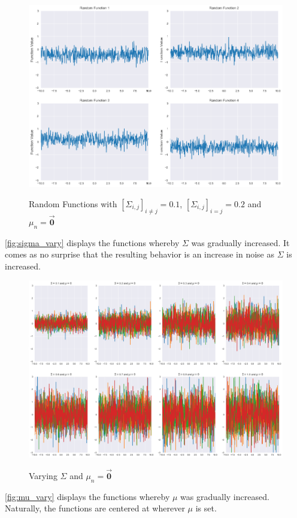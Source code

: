 \documentclass[twoside,11pt]{homework}
\DeclarePairedDelimiter{\2norm}{\lVert}{\rVert^2_2}
\newcommand{\1}[1]{\mathds{1}\left[#1\right]}
\begin{document}
\begin{figure}[H]
\centering
\caption{Random Functions with $[\Sigma_{i,j}]_{i \neq j} = 0.1$, $[\Sigma_{i,j}]_{i = j} = 0.2$ and $\mu_{n} = \bm{\vec{0}}$}
\includegraphics[scale=0.4]{"../code/figures/part_v_mean0_cov01"}
\label{fig:cov01}
\end{figure}
\noindent
\autoref{fig:sigma_vary} displays the functions whereby $\Sigma$ was gradually increased. It comes as no surprise that the resulting behavior is an increase in noise as $\Sigma$ is increased.

\begin{figure}[H]
\centering
\caption{Varying $\Sigma$ and $\mu_{n} = \bm{\vec{0}}$}
\includegraphics[scale=0.39]{"../code/figures/part_v_sigma"}
\label{fig:sigma_vary}
\end{figure}
\noindent
\autoref{fig:mu_vary} displays the functions whereby $\mu$ was gradually increased. Naturally, the functions are centered at wherever $\mu$ is set.
\end{document}
